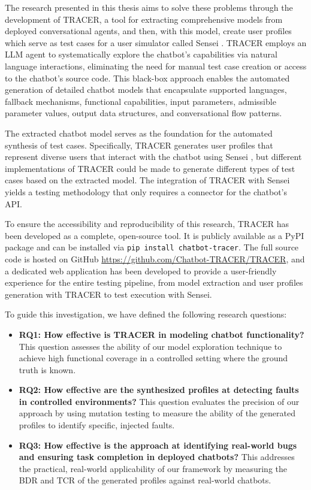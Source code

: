 The research presented in this thesis aims to solve these problems through the development of \ac{TRACER},
a tool for extracting comprehensive models from deployed conversational agents,
and then, with this model, create user profiles which serve as test cases
for a user simulator called Sensei \autocite{delaraSensei}.
\ac{TRACER} employs an \ac{LLM} agent to systematically explore the chatbot's capabilities via natural language interactions,
eliminating the need for manual test case creation or access to the chatbot's source code.
This black-box approach enables the automated generation of detailed chatbot models that encapsulate
supported languages, fallback mechanisms, functional capabilities, input parameters, admissible parameter values, output data structures, and conversational flow patterns.

The extracted chatbot model serves as the foundation for the automated synthesis of test cases.
Specifically, \ac{TRACER} generates user profiles that represent diverse users that interact with the chatbot using Sensei \autocite{delaraSensei},
but different implementations of \ac{TRACER} could be made to generate different types of test cases based on the extracted model.
The integration of \ac{TRACER} with Sensei yields a testing methodology that only requires a connector for the chatbot's API.


To ensure the accessibility and reproducibility of this research,
\ac{TRACER} has been developed as a complete, open-source tool.
It is publicly available as a \ac{PyPI} package \autocite{sotillodelhornoChatbottracerToolModel}
and can be installed via \texttt{pip install chatbot-tracer}.
The full source code is hosted on GitHub \url{https://github.com/Chatbot-TRACER/TRACER},
and a dedicated web application %
has been developed to provide a user-friendly experience for the entire testing pipeline,
from model extraction and user profiles generation with \ac{TRACER} to test execution with Sensei.

To guide this investigation, we have defined the following research questions:
\begin{itemize}
\item \textbf{RQ1: How effective is TRACER in modeling chatbot functionality?}
  This question assesses the ability of our model exploration technique to achieve high functional coverage in a controlled setting where the ground truth is known.
\item \textbf{RQ2: How effective are the synthesized profiles at detecting faults in controlled environments?}
  This question evaluates the precision of our approach by using mutation testing \autocite{gomez-abajoMutationTestingTaskOriented2024}
  to measure the ability of the generated profiles to identify specific, injected faults.
\item \textbf{RQ3: How effective is the approach at identifying real-world bugs and ensuring task completion in deployed chatbots?}
  This addresses the practical, real-world applicability of our framework
  by measuring the \ac{BDR} and \ac{TCR} of the generated profiles against real-world chatbots.
\end{itemize}

